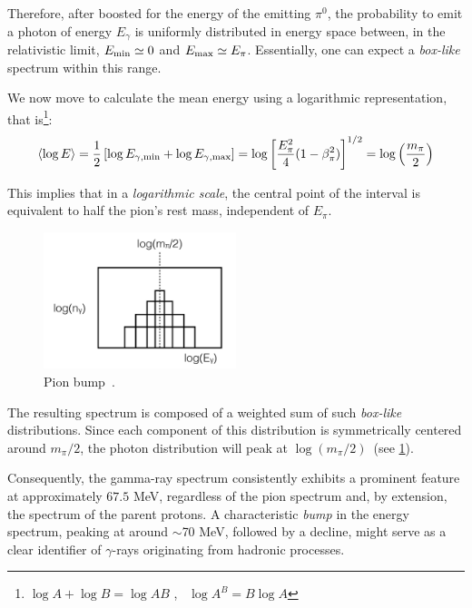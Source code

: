 Therefore, after boosted for the energy of the emitting $\pi^0$, the probability to emit a photon of energy $E_\gamma$  is uniformly distributed in energy space between, in the relativistic limit, \(E_{\rm min} \simeq 0\) and \(E_{\rm max} \simeq E_\pi\). Essentially, one can expect a \emph{box-like} spectrum within this range.

We now move to calculate the mean energy using a logarithmic representation, that is\footnote{\( \log A + \log B = \log AB \) , \, \( \log A^B = B \log A \)}:
%
\begin{equation}
\langle \log E \rangle 
= \frac{1}{2} \left[ \log E_{\rm \gamma, min} + \log E_{\rm \gamma, max} \right] 
= \log \left[ \frac{E_\pi^2}{4} (1-\beta_\pi^2) \right]^{1/2} = \log \left(\frac{m_\pi}{2}\right)
\end{equation}

This implies that in a \emph{logarithmic scale}, the central point of the interval is equivalent to half the pion's rest mass, independent of \(E_\pi\).

\begin{figure}[t]
\centering
\includegraphics[width=0.5\textwidth]{figures/pion_bump.png}
\caption{Pion bump~.}
\label{fig:pionbump}
\end{figure}

The resulting spectrum is composed of a weighted sum of such \emph{box-like} distributions. Since each component of this distribution is symmetrically centered around \( m_\pi / 2 \), the photon distribution will peak at \( \log(m_\pi / 2) \)~(see \cref{fig:pionbump}).

Consequently, the gamma-ray spectrum consistently exhibits a prominent feature at approximately \( 67.5 \) MeV, regardless of the pion spectrum and, by extension, the spectrum of the parent protons.
%
A characteristic \emph{bump} in the energy spectrum, peaking at around $\sim$70 MeV, followed by a decline, might serve as a clear identifier of $\gamma$-rays originating from hadronic processes.

